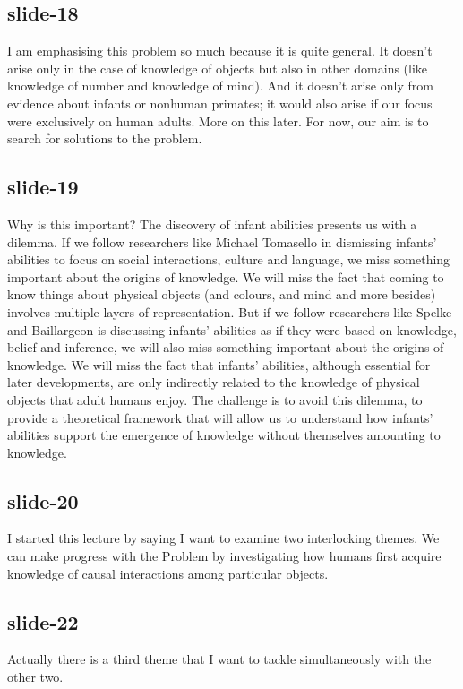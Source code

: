 \documentclass[12pt,\papersize]{extarticle}
\begin{document}
\subsection{slide-18}
I am emphasising this problem so much because it is quite general.
It doesn't arise only in the case of knowledge of objects but also in other domains (like knowledge of number and knowledge of mind).
And it doesn't arise only from evidence about infants or nonhuman primates; it would also arise if our focus were exclusively on human adults.
More on this later.
For now, our aim is to search for solutions to the problem.
 
\subsection{slide-19}
Why is this important?
The discovery of infant abilities presents us with a dilemma.
If we follow researchers like Michael Tomasello in dismissing infants' abilities to focus on 
social interactions, culture and language, we miss something important about the origins of 
knowledge.  We will miss the fact that coming to know things about physical objects (and 
colours, and mind and more besides) involves multiple layers of representation.
But if we follow researchers like Spelke and Baillargeon is discussing infants' abilities as 
if they were based on knowledge, belief and inference, we will also miss something important 
about the origins of knowledge.  We will miss the fact that infants' abilities, although 
essential for later developments, are only indirectly related to the knowledge of physical 
objects that adult humans enjoy.
The challenge is to avoid this dilemma, to provide a theoretical framework that will allow us 
to understand how infants' abilities support the emergence of knowledge without themselves 
amounting to knowledge.
 
\subsection{slide-20}
I started this lecture by saying I want to examine two interlocking themes.  
We can make progress with the Problem by investigating how humans first acquire 
knowledge of causal interactions among particular objects.
 
\subsection{slide-22}
Actually there is a third theme that I want to tackle simultaneously with the other two.
 
\end{document}
